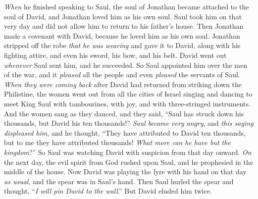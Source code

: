 \begin{biblechapter} %
 \textit{When} he finished speaking to Saul, the soul of Jonathan became attached to the soul of David, and Jonathan loved him as his own soul.
\verse Saul took him on that very day and did not allow him to return to his father’s house.
\verse Then Jonathan made a covenant with David, because he loved him as his own soul.
\verse Jonathan stripped off the robe \textit{that he was wearing} and gave it to David, along with his fighting attire, and even his sword, his bow, and his belt.
 David went out \textit{whenever} Saul sent him, and he succeeded. So Saul appointed him over the men of the war, and it \textit{pleased} all the people and even \textit{pleased} the servants of Saul.
\verse \textit{When they were coming back} after David had returned from striking down the Philistine, the women went out from all the cities of Israel singing and dancing to meet King Saul with tambourines, with joy, and with three-stringed instruments.
\verse And the women sang as they danced, and they said, “Saul has struck down his thousands, 
but David his ten thousands!”
\verse \textit{Saul became very angry}, and \textit{this saying displeased him}, and he thought, “They have attributed to David ten thousands, but to me they have attributed thousands! \textit{What more can he have but the kingdom}?”
\verse So Saul was watching David with suspicion from that day onward.
\verse \textit{On} the next day, the evil spirit from God rushed upon Saul, and he prophesied in the middle of the house. Now David was playing the lyre with his hand on that day \textit{as usual}, and the spear was in Saul’s hand.
\verse Then Saul hurled the spear and thought, “\textit{I will pin David to the wall}.” But David eluded him twice.

\end{biblechapter}
